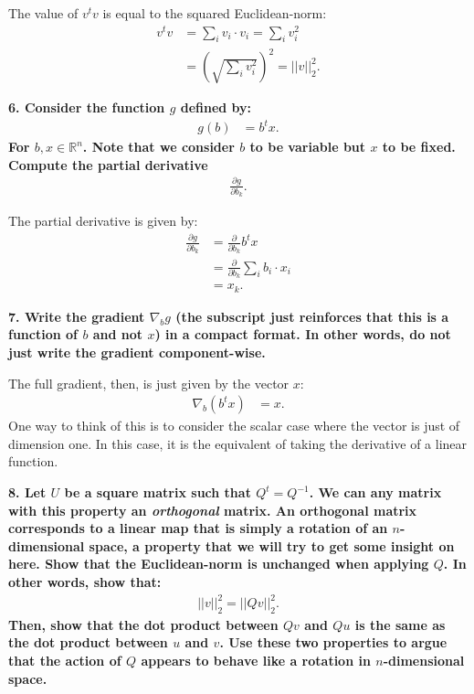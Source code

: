 \documentclass[12pt,hidelinks]{article}
\numberwithin{equation}{section}
\begin{document}
\vspace*{12pt}

The value of $v^t v$ is equal to the squared Euclidean-norm:
\begin{align}
v^t v &= \sum_i v_i \cdot v_i = \sum_i v_i^2 \\
&= \left( \sqrt{\sum_i v_i^2} \right)^2 = || v ||_2^2.
\end{align}

\vspace*{12pt}

\textbf{6. Consider the function $g$ defined by:}
\begin{align}
g(b) &= b^t x.
\end{align}
\textbf{For $b, x \in \mathbb{R}^n$. Note that we consider $b$ to be variable but $x$
to be fixed. Compute the partial derivative}
\begin{align}
\frac{\partial g}{\partial b_k}.
\end{align}

\vspace*{12pt}

The partial derivative is given by:
\begin{align}
\frac{\partial g}{\partial b_k} &= \frac{\partial}{\partial b_k} b^t x \\
&= \frac{\partial}{\partial b_k} \sum_i b_i \cdot x_i \\
&= x_k.
\end{align}

\vspace*{12pt}

\textbf{7. Write the gradient $\nabla_b g$ (the subscript just reinforces that this
is a function of $b$ and not $x$) in a compact format. In other words, do not
just write the gradient component-wise.}

\vspace*{12pt}

The full gradient, then, is just given by the vector $x$:
\begin{align}
\nabla_b (b^t x) &= x.
\end{align}
One way to think of this is to consider the scalar case where the vector is just
of dimension one. In this case, it is the equivalent of taking the derivative of
a linear function.

\vspace*{12pt}

\textbf{8. Let $U$ be a square matrix such that $Q^t = Q^{-1}$. We can any matrix
with this property an \textit{orthogonal} matrix. An orthogonal matrix corresponds
to a linear map that is simply a rotation of an $n$-dimensional space, a property
that we will try to get some insight on here. Show that the Euclidean-norm is
unchanged when applying $Q$. In other words, show that:}
\begin{align}
||v||_2^2 = ||Q v ||_2^2.
\end{align}
\textbf{Then, show that the dot product between $Qv$ and $Qu$ is the same as the dot
product between $u$ and $v$. Use these two properties to argue that the action of
$Q$ appears to behave like a rotation in $n$-dimensional space.}
\end{document}
